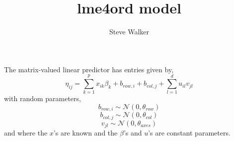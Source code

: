 \documentclass{article}
\title{lme4ord model}
\author{Steve Walker}
\date{}
\newcommand{\mat}{\bm}
\newcommand{\trans}{^\top}
\newcommand{\dnorm}{\mathcal{N}}
\begin{document}
\maketitle



The matrix-valued linear predictor has entries given by,
\begin{equation}
  \label{eq:3}
  \eta_{ij} = \sum_{k = 1}^p x_{ik}\beta_{k} + b_{row, i} + b_{col, j} + \sum_{l = 1}^d u_{il}v_{jl}
\end{equation}
with random parameters,
\begin{equation}
  \label{eq:4}
  b_{row, i} \sim \dnorm(0, \theta_{row})
\end{equation}
\begin{equation}
  \label{eq:4}
  b_{col, j} \sim \dnorm(0, \theta_{col})
\end{equation}
\begin{equation}
  \label{eq:5}
  v_{jl} \sim \dnorm(0, \theta_{axes})
\end{equation}
and where the $x$'s are known and the $\beta$'s and $u$'s are constant parameters.
\end{document}
